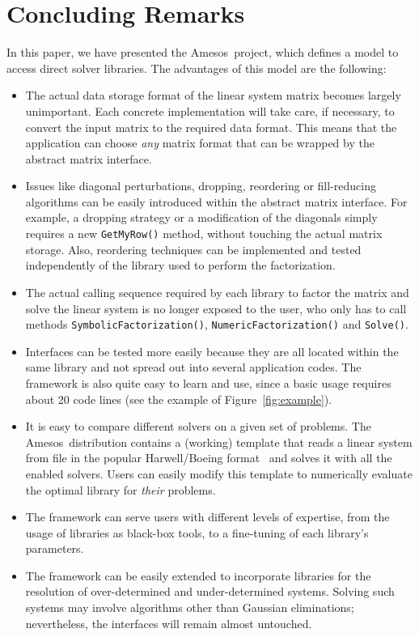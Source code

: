 \documentclass{llncs}
\newcommand{\amesos}{{\sc Amesos}}
\begin{document}
\section{Concluding Remarks}
\label{sec:conclusions}

In this paper, we have presented the \amesos\ project, which defines a model
to access direct solver libraries. The advantages of this model are the
following:
\begin{itemize}
%
\item The actual data storage format of the linear system matrix becomes largely unimportant.
Each concrete implementation will take care, if necessary, to convert the
input matrix to the required data format. This means that the
application can choose {\sl any} matrix format that can be wrapped by the
abstract matrix interface.
%
\item Issues like diagonal perturbations, dropping, reordering or
fill-reducing algorithms
can be easily introduced within the abstract matrix interface.
For example, a dropping strategy or a modification of the diagonals simply
requires a new \verb!GetMyRow()! method, without touching the actual matrix
storage. Also, reordering techniques can be implemented and tested
independently of the library used to perform the factorization.
%
\item The actual calling sequence required by each library to factor the
matrix and solve the linear system is no longer exposed to the user, who only
has to call methods \verb!SymbolicFactorization()!, \verb!NumericFactorization()! and
\verb!Solve()!.
%
\item Interfaces can be tested more easily because they are all located within
the same library and not spread out into several application codes. The
framework is also quite easy to learn and use, since a basic usage
requires about 20 code lines (see the example of Figure~\ref{fig:example}).
%
\item It is easy to compare different solvers on a given set of problems. The
\amesos\ distribution contains a (working) template that reads a linear system
from file in the popular Harwell/Boeing format~\cite{duff89sparse} and solves it with all the
enabled solvers. Users can easily modify this template to numerically evaluate
the optimal library for {\sl their} problems.
%
\item
The framework can serve users with different levels of expertise, from the
usage of libraries as black-box tools, to a fine-tuning of each library's
parameters.
%
\item
The framework can be easily extended to incorporate libraries for the
resolution of over-determined and under-determined systems. Solving such
systems may involve algorithms other than Gaussian eliminations; nevertheless,
the interfaces will remain almost untouched.
%
\end{itemize}
\end{document}
